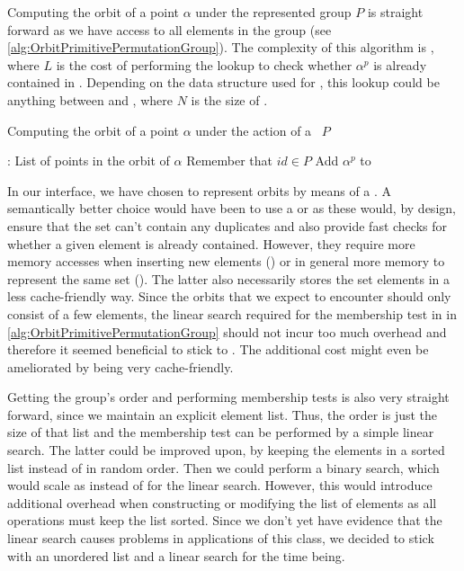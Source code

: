 \documentclass[parskip=half]{scrartcl}
\begin{document}
	Computing the orbit of a point $\alpha$ under the represented group $P$ is straight forward as we have access to all elements in the group (see
	\cref{alg:OrbitPrimitivePermutationGroup}). The complexity of this algorithm is , where $L$ is the cost of performing the
	lookup to check whether $\alpha^p$ is already contained in . Depending on the data structure used for , this lookup could
	be anything between  and , where $N$ is the size of .

	\begin{algorithm}
		\caption{Computing the orbit of a point $\alpha$ under the action of a ~$P$}
		\label{alg:OrbitPrimitivePermutationGroup}

		\begin{algorithmic}[1]
				\State {}: List of points in the orbit of $\alpha$
				\Comment Remember that $id \in P$
						\State Add $\alpha^p$ to 
					\EndIf
				\EndFor
				\State \Return {}
			\EndFunction
		\end{algorithmic}
	\end{algorithm}

	In our interface, we have chosen to represent orbits by means of a . A semantically better choice would have been to use a
	 or  as these would, by design, ensure that the set can't contain any duplicates and also
	provide fast checks for whether a given element is already contained. However, they require more memory accesses when inserting new elements
	() or in general more memory to represent the same set (). The latter also necessarily
	stores the set elements in a less cache-friendly way. Since the orbits that we expect to encounter should only consist of a few elements, the
	linear search required for the membership test in  in \cref{alg:OrbitPrimitivePermutationGroup} should not incur too much overhead and
	therefore it seemed beneficial to stick to . The additional cost might even be ameliorated by  being very
	cache-friendly.

	Getting the group's order and performing membership tests is also very straight forward, since we maintain an explicit element list. Thus, the
	order is just the size of that list and the membership test can be performed by a simple linear search. The latter could be improved upon, by
	keeping the elements in a sorted list instead of in random order. Then we could perform a binary search, which would scale as 
	instead of  for the linear search. However, this would introduce additional overhead when constructing or modifying the list of
	elements as all operations must keep the list sorted. Since we don't yet have evidence that the linear search causes problems in applications of
	this class, we decided to stick with an unordered list and a linear search for the time being.
\end{document}
